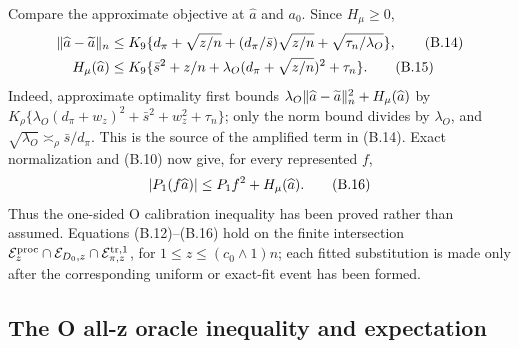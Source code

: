 Compare the approximate objective at \(\widehat a\) and \(a_0\).  Since
\(H_\mu\ge0\),
\begin{align}
 \lVert \widehat a-\widetilde a\rVert_n
 &\le K_9\{d_\pi+\sqrt{z/n}
      +(d_\pi/\bar s)\sqrt{z/n}
      +\sqrt{\tau_n/\lambda_O}\},\tag{B.14}\\
 H_\mu(\widehat a)
 &\le K_9\{\bar s^2+z/n
       +\lambda_O(d_\pi+\sqrt{z/n})^2+\tau_n\}.
 \tag{B.15}
\end{align}
Indeed, approximate optimality first bounds
\(\lambda_O\lVert \widehat a-\widetilde a\rVert_n^2+H_\mu(\widehat a)\) by
\(K_\rho\{\lambda_O(d_\pi+w_z)^2+\bar s^2+w_z^2+\tau_n\}\);
only the norm bound divides by \(\lambda_O\), and
\(\sqrt{\lambda_O}\asymp_\rho\bar s/d_\pi\).  This is the source of the
amplified term in (B.14).
Exact normalization and (B.10) now give, for every represented \(f\),
\begin{equation}
 \lvert P_1(f\widehat a)\rvert
 \le P_1f^2+H_\mu(\widehat a).
 \tag{B.16}
\end{equation}
Thus the one-sided O calibration inequality has been proved rather than
assumed.
Equations (B.12)--(B.16) hold on the finite intersection
\(\mathcal E_z^{\rm proc}\cap\mathcal E_{D_0,z}\cap
\mathcal E_{\pi,z}^{\rm tr,1}\), for
\(1\le z\le(c_0\wedge1)n\); each fitted substitution is made only after
the corresponding uniform or exact-fit event has been formed.

\subsection{The O all-z oracle inequality and expectation}
\label{app:upper-o-oracle}

